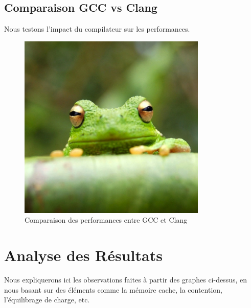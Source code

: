 \documentclass{article}
\begin{document}
\subsection{Comparaison GCC vs Clang}
Nous testons l'impact du compilateur sur les performances.

\begin{figure}[h]
    \centering
    \includegraphics[width=0.8\textwidth]{frog.jpg}  %
    \caption{Comparaison des performances entre GCC et Clang}
    \label{fig:gcc_vs_clang}
\end{figure}

\section{Analyse des Résultats}
Nous expliquerons ici les observations faites à partir des graphes ci-dessus, en nous basant sur des éléments comme la mémoire cache, la contention, l'équilibrage de charge, etc.
\end{document}
